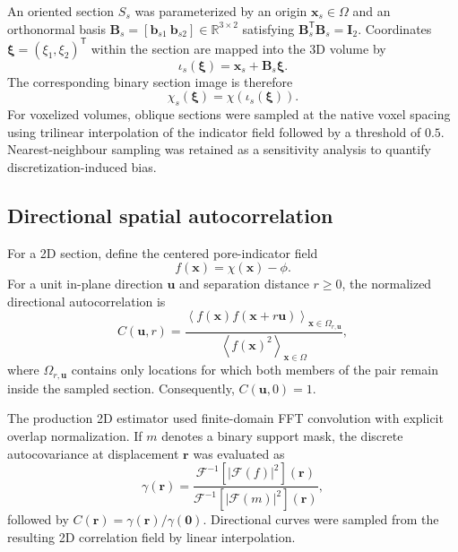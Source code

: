 \documentclass{article}
\begin{document}
An oriented section $S_s$ was parameterized by an origin
$\bm{x}_{s}\in\Omega$ and an orthonormal basis
$\bm{B}_{s}=[\bm{b}_{s1}\ \bm{b}_{s2}]\in\mathbb{R}^{3\times2}$ satisfying
$\bm{B}_{s}^{\mathsf T}\bm{B}_{s}=\bm{I}_{2}$. Coordinates
$\bm{\xi}=(\xi_{1},\xi_{2})^{\mathsf T}$ within the section are mapped into
the 3D volume by
\begin{equation}
    \iota_{s}(\bm{\xi})
    =
    \bm{x}_{s}
    +
    \bm{B}_{s}\bm{\xi}.
    \label{eq:section_embedding}
\end{equation}
The corresponding binary section image is therefore
\begin{equation}
    \chi_{s}(\bm{\xi})
    =
    \chi\!\left(\iota_{s}(\bm{\xi})\right).
    \label{eq:section_indicator}
\end{equation}
For voxelized volumes, oblique sections were sampled at the native voxel
spacing using trilinear interpolation of the indicator field followed by a
threshold of $0.5$. Nearest-neighbour sampling was retained as a sensitivity
analysis to quantify discretization-induced bias.

\subsection{Directional spatial autocorrelation}
\label{subsec:directional_acf}

For a 2D section, define the centered pore-indicator field
\begin{equation}
    f(\bm{x})=\chi(\bm{x})-\phi.
    \label{eq:centered_indicator}
\end{equation}
For a unit in-plane direction $\bm{u}$ and separation distance $r\geq0$, the
normalized directional autocorrelation is
\begin{equation}
    C(\bm{u},r)
    =
    \frac{
    \left\langle
        f(\bm{x})f(\bm{x}+r\bm{u})
    \right\rangle_{\bm{x}\in\Omega_{r,\bm{u}}}
    }{
    \left\langle
        f(\bm{x})^{2}
    \right\rangle_{\bm{x}\in\Omega}
    },
    \label{eq:directional_acf}
\end{equation}
where $\Omega_{r,\bm{u}}$ contains only locations for which both members of
the pair remain inside the sampled section. Consequently,
$C(\bm{u},0)=1$.

The production 2D estimator used finite-domain FFT convolution with explicit
overlap normalization. If $m$ denotes a binary support mask, the discrete
autocovariance at displacement $\bm{r}$ was evaluated as
\begin{equation}
    \gamma(\bm{r})
    =
    \frac{
    \mathcal{F}^{-1}
    \left[
        |\mathcal{F}(f)|^{2}
    \right](\bm{r})
    }{
    \mathcal{F}^{-1}
    \left[
        |\mathcal{F}(m)|^{2}
    \right](\bm{r})
    },
    \label{eq:fft_covariance}
\end{equation}
followed by $C(\bm{r})=\gamma(\bm{r})/\gamma(\bm{0})$. Directional curves
were sampled from the resulting 2D correlation field by linear interpolation.
\end{document}
